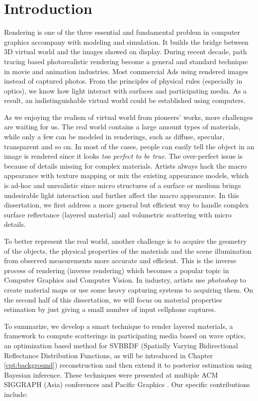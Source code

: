 \chapter{Introduction}
\label{cpt:introduction}

Rendering is one of the three essential and fundamental problem in computer graphics accompany with modeling and simulation. It builds the bridge between 3D virtual world and the images showed on display. During recent decade, path tracing based photorealistic rendering become a general and standard technique in movie and animation industries.  Most commercial Ads using rendered images instead of captured photos. From the principles of physical rules (especially in optics), we know how light interact with surfaces and participating media. As a result, an indistinguishable virtual world could be established using computers.  

As we enjoying the realism of virtual world from pioneers' works, more challenges are waiting for us. The real world contains a large amount types of materials, while only a few can be modeled in renderings, such as diffuse, specular, transparent and so on. In most of the cases, people can easily tell the object in an image is rendered since it looks \emph{too perfect to be true}. The over-perfect issue is because of details missing for complex materials. Artists always hack the macro appearance with texture mapping or mix the existing appearance models, which is ad-hoc and unrealistic since micro structures of a surface or medium brings undesirable light interaction and further affect the macro appearance.
In this dissertation, we first address a more general but efficient way to handle complex surface reflectance (layered material) and volumetric scattering with micro details.

To better represent the real world, another challenge is to acquire the geometry of the objects, the physical properties of the materials and the scene illumination from observed measurements more accurate and efficient. This is the inverse process of rendering (inverse rendering) which becomes a popular topic in Computer Graphics and Computer Vision. In industry, artists use \emph{photoshop} to create material maps or use some heavy capturing systems to acquiring them. On the second half of this dissertation, we will focus on material properties estimation by just giving a small number of input cellphone captures.

To summarize, we develop a smart technique to render layered materials, a framework to compute scatterings in participating media based on wave optics, an optimization based method for SVBRDF (Spatially Varying Bidirectional Reflectance Distribution Functions,
as will be introduced in Chapter \ref{cpt:background}) reconstruction and then extend it to posterior estimation using Bayesian inference.
These techniques were presented at multiple ACM SIGGRAPH (Asia) conferences \cite{guo2018position, guo2021beyond, guo2020materialgan} and Pacific Graphics \cite{guo2020bayesian}. Our specific contributions include:

